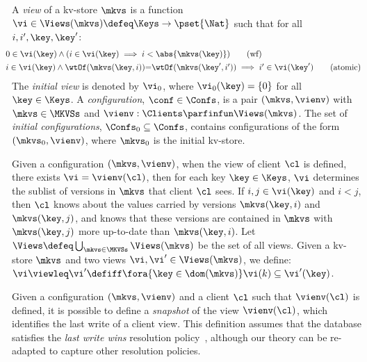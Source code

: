 \begin{definition}[Views]
\label{def:view}
\label{def:cuts}
\label{def:views}
\label{def:configuration}
A \emph{view} of a kv-store $\mkvs$ is a function
$\vi \in \Views(\mkvs) \defeq \Keys \to\pset{\Nat}$ such that for all $i, i', \key, \key'$:
%
{\small
\begin{align}
    & \hspace*{-8pt}
    0 \in \vi(\key) 
    \land (i \in \vi(\key) \implies i < \abs{ \mkvs(\key) }) 
    \tag{wf}
    \label{eq:view.wf}\\
    & \hspace*{-8pt}
    \begin{array}{@{}l@{}}
	i \in \vi(\key)  
  	\land \wtOf(\mkvs(\key, i)) {=} \wtOf(\mkvs(\key', i'))  
  	\implies i' \in \vi(\key')
    \end{array}
	\tag{atomic}
	\label{eq:view.atomic}
\end{align}
}
%
\noindent The \emph{initial view} is denoted by $\vi_{0}$, where $\vi_{0}(\key) = \{0\}$ for all $\key \in \Keys$. 
A \emph{configuration}, $\conf \in \Confs$,  is a pair $ (\mkvs, \vienv)$
with $\mkvs \in \MKVSs$ and
$\vienv : \Clients \parfinfun \Views(\mkvs)$. 
The set of \emph{initial configurations}, $\Confs_0 \subseteq \Confs$, contains configurations of the form $ (\mkvs_0, \vienv)$, where $\mkvs_0$ is the initial kv-store. 
\end{definition}
%


Given a configuration $(\mkvs, \vienv)$, when the view of client 
$\cl$ is defined, \ie there exists $\vi = \vienv(\cl)$, then for each key $\key \in \Keys$, 
$\vi$ determines the sublist of versions in $\mkvs$ that client $\cl$ sees. 
If $i,j \in \vi(\key)$ and $i < j$, then $\cl$ knows about the values 
carried by versions $\mkvs(\key, i)$ and  $\mkvs(\key, j)$, 
and  knows that these versions are contained in $\mkvs$ with  $\mkvs(\key, j)$ more 
up-to-date than $\mkvs(\key, i)$. 
Let $\Views \defeq \bigcup_{\mkvs \in \MKVSs} \Views(\mkvs)$ be the set of all views. 
Given a kv-store $\mkvs$ and two views $\vi, \vi' \in \Views(\mkvs)$, 
we define: $\vi \viewleq \vi' \defiff \fora{\key \in \dom(\mkvs)} \vi(k) \subseteq \vi'(\key)$.

Given a configuration $(\mkvs, \vienv)$ and a client $\cl$ such that $\vienv(\cl)$ is
defined, it is possible to define a \emph{snapshot} of the
view $\vienv  (\cl)$, which identifies the last write of a client
view. This definition assumes that the database satisfies the \emph{last write wins}
resolution policy~\cite{framework-concur}, although our theory can be 
re-adapted to capture other resolution policies. 

